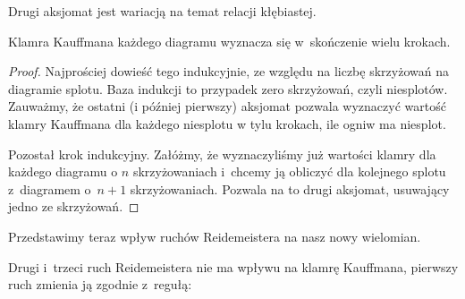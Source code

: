 Drugi aksjomat jest wariacją na temat relacji kłębiastej.

\begin{lemma}
    Klamra Kauffmana każdego diagramu wyznacza się w~skończenie wielu krokach.
\end{lemma}

\begin{proof}
    Najprościej dowieść tego indukcyjnie, ze względu na liczbę skrzyżowań na diagramie splotu.
    Baza indukcji to przypadek zero skrzyżowań, czyli niesplotów.
    Zauważmy, że ostatni (i później pierwszy) aksjomat pozwala wyznaczyć wartość klamry Kauffmana dla każdego niesplotu w tylu krokach, ile ogniw ma niesplot.

    Pozostał krok indukcyjny.
    Załóżmy, że wyznaczyliśmy już wartości klamry dla każdego diagramu o $n$ skrzyżowaniach i~chcemy ją obliczyć dla kolejnego splotu z~diagramem o~$n + 1$ skrzyżowaniach.
    Pozwala na to drugi aksjomat, usuwający jedno ze skrzyżowań.
\end{proof}

Przedstawimy teraz wpływ ruchów Reidemeistera na nasz nowy wielomian.

\begin{lemma}
    Drugi i~trzeci ruch Reidemeistera nie ma wpływu na klamrę Kauffmana,
    pierwszy ruch zmienia ją zgodnie z~regułą:
\begin{comment}
    \begin{equation}
        \bracket{\MediumReidemeisterOneLeft} = -A^{-3} \bracket{\,\MediumReidemeisterOneStraight\,}.
    \end{equation}
\end{comment}
\end{lemma}

